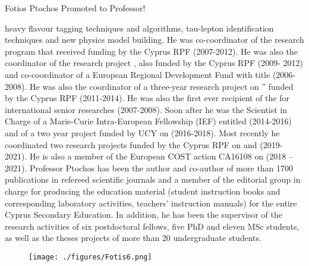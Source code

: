 \begin{headline}[enhanced, tikz={rotate=0}]{Fotios Ptochos Promoted to Professor!}
\begin{multicols}{2}
heavy flavour tagging techniques and algorithms, tau-lepton
identification techniques and new physics model building. 
He was co-coordinator of the research program
 that
received funding by the Cyprus RPF (2007-2012). He was also the
coordinator of the research project , also funded by the Cyprus RPF (2009- 2012) and
co-coordinator of a European Regional Development Fund with title  (2006-2008). He was also the coordinator of a three-year
research project on ”
funded by the Cyprus RPF (2011-2014). He was also the first
ever recipient of the 
for international senior researches (2007-2008). Soon after he was
the Scientist in Charge of a Marie-Curie Intra-European Fellowship
(IEF) entitled 
(2014-2016) and of a two year project funded by UCY on  (2016-2018). Most recently he coordinated
 two research projects funded by the Cyprus RPF on  and  (2019-2021). He
is also a member of the European COST action CA16108 on  (2018 – 2021). 
Professor Ptochos has been the author and co-author of more than 
1700 publications in refereed scientific journals and a member of the
editorial group in charge for producing the education material
(student instruction books and corresponding laboratory activities,
teachers’ instruction manuals) for the entire Cyprus Secondary
Education. In addition, he has been the supervisor of the research
activities of six postdoctoral fellows, five PhD and eleven MSc
students, as well as the theses projects of more than 20 undergraduate students.

    \begin{figure}
      \begin{center}
        \vspace{-0.2in}
        \leavevmode
        \texttt{[image: ./figures/Fotis6.png]}
      \end{center}
    \end{figure}
  \end{multicols}
\end{headline}
